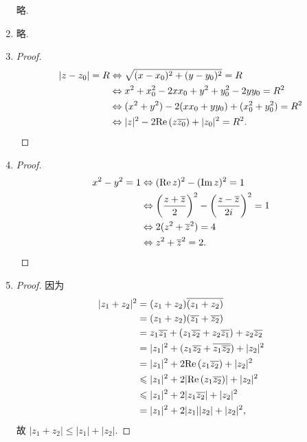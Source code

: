 \begin{enumerate}
    略.
\item %
    略.
\item %
    \begin{proof}
        \begin{align*}
            |z - z_0| = R &\Leftrightarrow \sqrt{(x-x_0)^2 + (y-y_0)^2} = R \\
            &\Leftrightarrow x^2 + x_0^2 - 2xx_0 + y^2 + y_0^2 - 2yy_0 = R^2 \\
            &\Leftrightarrow (x^2 + y^2) - 2(xx_0 + yy_0) + (x_0^2 + y_0^2) = R^2 \\
            &\Leftrightarrow |z|^2 - 2\mathrm{Re}\,(z\overline{z_0}) + |z_0|^2 = R^2. \qedhere
        \end{align*}
    \end{proof}
\item %
    \begin{proof}
        \begin{align*}
            x^2 - y^2 = 1 &\Leftrightarrow (\mathrm{Re}\,{z})^2 - (\mathrm{Im}\,{z})^2 = 1 \\
            &\Leftrightarrow \left(\frac{z+\overline{z}}{2}\right)^2 - \left(\frac{z-\overline{z}}{2i}\right)^2 = 1 \\
            &\Leftrightarrow 2(z^2 + \overline{z}^2) = 4 \\
            &\Leftrightarrow z^2 + \overline{z}^2 = 2. \qedhere
        \end{align*}
    \end{proof}
\item %
    \begin{proof}
        因为
        \begin{align*}
            |z_1 + z_2|^2 &= (z_1 + z_2)\overline{(z_1 + z_2)} \\
            &= (z_1 + z_2)(\overline{z_1} + \overline{z_2}) \\
            &= z_1\overline{z_1} + (z_1\overline{z_2} + z_2\overline{z_1}) + z_2\overline{z_2} \\
            &= |z_1|^2 + (z_1\overline{z_2} + \overline{z_1\overline{z_2}}) + |z_2|^2 \\
            &= |z_1|^2 + 2\mathrm{Re}\,(z_1\overline{z_2}) + |z_2|^2 \\
            &\leqslant |z_1|^2 + 2|\mathrm{Re}\,(z_1\overline{z_2})| + |z_2|^2 \\
            &\leqslant |z_1|^2 + 2|z_1\overline{z_2}| + |z_2|^2 \\
            &= |z_1|^2 + 2|z_1||z_2| + |z_2|^2,    
        \end{align*}
        故 $|z_1 + z_2| \leqslant |z_1| + |z_2|$.
    \end{proof}
\end{enumerate}
% 
